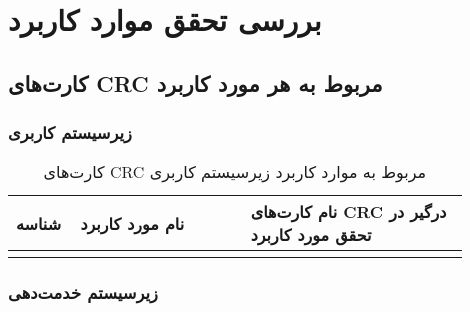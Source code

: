 

\chapter{بررسی تحقق موارد کاربرد}


\section{کارت‌های CRC مربوط به هر مورد کاربرد}

\subsection{زیرسیستم کاربری}

\begin{table}[ht!]
	\centering
	\begin{tabular}{|p{0.1\linewidth}|p{0.35\linewidth}|p{0.45\linewidth}|} 
				\hline
			 شناسه  & نام مورد کاربرد  & نام کارت‌های CRC درگیر در تحقق مورد کاربرد\\ 
		\hline
		\usecasecrcitem{ثبت نام}{کاربر عادی}
		\usecasecrcitem{ورود}{کاربر }
		\usecasecrcitem{خروج}{کاربر }
		\usecasecrcitem{جست‌وجوی کاربران}{کاتالوگ کاربر، مدیر شرکت}
		\usecasecrcitem{مشاهده کاربران}{کاتالوگ کاربر، مدیر شرکت}
		\usecasecrcitem{تایید متخصص}{کاربر مدیر، متخصص}
		\usecasecrcitem{اضافه کردن مدیر جدید}{کاربر، مدیر شرکت}
		\usecasecrcitem{		ویرایش اطلاعات کاربری}{کاربر }

	\end{tabular}
	\caption{کارت‌های CRC مربوط به موارد کاربرد زیرسیستم کاربری}
\end{table}

\newpage
\subsection{زیرسیستم خدمت‌دهی}


